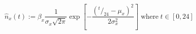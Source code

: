 \begin{equation}
\hat{n}_x(t) := \beta_x\frac{1}{\sigma_x\sqrt{2\pi}} \exp\left[-\frac{\left(^t/_{24}-\mu_x\right)^2}{2\sigma_x^2}\right] \;\text{where}\; t \in [0, 24]
\label{ch4:equ:normal-distribution}
\end{equation}
